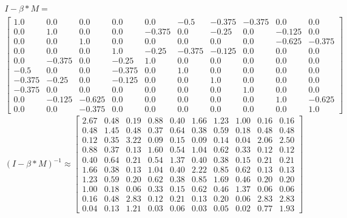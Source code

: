 \begin{gather}
	\nonumber I - \beta * M = \\
	\begin{bmatrix}
		1.0 & 0.0 & 0.0 & 0.0 & 0.0 & -0.5 & -0.375 & -0.375 & 0.0 & 0.0\\
		0.0 & 1.0 & 0.0 & 0.0 & -0.375 & 0.0 & -0.25 & 0.0 & -0.125 & 0.0\\
		0.0 & 0.0 & 1.0 & 0.0 & 0.0 & 0.0 & 0.0 & 0.0 & -0.625 & -0.375\\
		0.0 & 0.0 & 0.0 & 1.0 & -0.25 & -0.375 & -0.125 & 0.0 & 0.0 & 0.0\\
		0.0 & -0.375 & 0.0 & -0.25 & 1.0 & 0.0 & 0.0 & 0.0 & 0.0 & 0.0\\
		-0.5 & 0.0 & 0.0 & -0.375 & 0.0 & 1.0 & 0.0 & 0.0 & 0.0 & 0.0\\
		-0.375 & -0.25 & 0.0 & -0.125 & 0.0 & 0.0 & 1.0 & 0.0 & 0.0 & 0.0\\
		-0.375 & 0.0 & 0.0 & 0.0 & 0.0 & 0.0 & 0.0 & 1.0 & 0.0 & 0.0\\
		0.0 & -0.125 & -0.625 & 0.0 & 0.0 & 0.0 & 0.0 & 0.0 & 1.0 & -0.625\\
		0.0 & 0.0 & -0.375 & 0.0 & 0.0 & 0.0 & 0.0 & 0.0 & 0.0 & 1.0
	\end{bmatrix}
	\label{frml:berechnungDerKatzZentralitaet:formel3}
\end{gather}
\begin{equation}
	(I - \beta * M)^{-1} \approx \begin{bmatrix}
		2.67 & 0.48 & 0.19 & 0.88 & 0.40 & 1.66 & 1.23 & 1.00 & 0.16 & 0.16\\
		0.48 & 1.45 & 0.48 & 0.37 & 0.64 & 0.38 & 0.59 & 0.18 & 0.48 & 0.48\\
		0.12 & 0.35 & 3.22 & 0.09 & 0.15 & 0.09 & 0.14 & 0.04 & 2.06 & 2.50\\
		0.88 & 0.37 & 0.13 & 1.60 & 0.54 & 1.04 & 0.62 & 0.33 & 0.12 & 0.12\\
		0.40 & 0.64 & 0.21 & 0.54 & 1.37 & 0.40 & 0.38 & 0.15 & 0.21 & 0.21\\
		1.66 & 0.38 & 0.13 & 1.04 & 0.40 & 2.22 & 0.85 & 0.62 & 0.13 & 0.13\\
		1.23 & 0.59 & 0.20 & 0.62 & 0.38 & 0.85 & 1.69 & 0.46 & 0.20 & 0.20\\
		1.00 & 0.18 & 0.06 & 0.33 & 0.15 & 0.62 & 0.46 & 1.37 & 0.06 & 0.06\\
		0.16 & 0.48 & 2.83 & 0.12 & 0.21 & 0.13 & 0.20 & 0.06 & 2.83 & 2.83\\
		0.04 & 0.13 & 1.21 & 0.03 & 0.06 & 0.03 & 0.05 & 0.02 & 0.77 & 1.93
	\end{bmatrix}
	\label{frml:berechnungDerKatzZentralitaet:formel4}
\end{equation}
